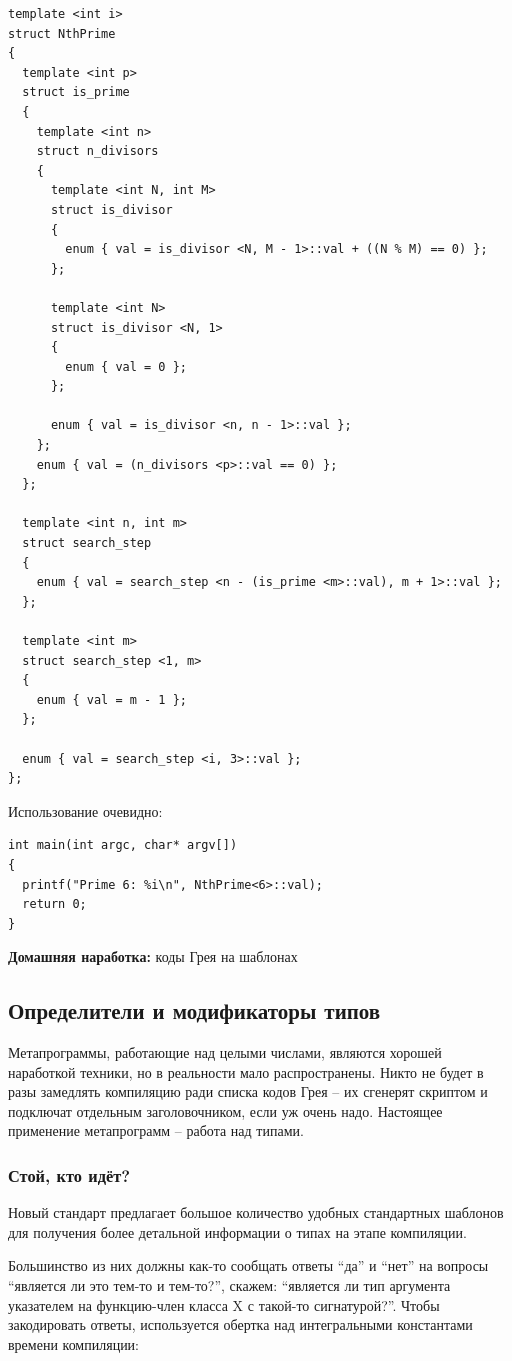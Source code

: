 \documentclass[a4paper,12pt,oneside]{article}
\begin{document}
\begin{lstlisting}
template <int i>
struct NthPrime
{
  template <int p>
  struct is_prime
  {
    template <int n>
    struct n_divisors
    {
      template <int N, int M>
      struct is_divisor
      {
        enum { val = is_divisor <N, M - 1>::val + ((N % M) == 0) };
      };

      template <int N>
      struct is_divisor <N, 1>
      {
        enum { val = 0 };
      };

      enum { val = is_divisor <n, n - 1>::val };
    };
    enum { val = (n_divisors <p>::val == 0) };
  };

  template <int n, int m>
  struct search_step
  {
    enum { val = search_step <n - (is_prime <m>::val), m + 1>::val };
  };

  template <int m>
  struct search_step <1, m>
  {
    enum { val = m - 1 };
  };

  enum { val = search_step <i, 3>::val };
};
\end{lstlisting}

Использование очевидно:

\begin{lstlisting}
int main(int argc, char* argv[])
{
  printf("Prime 6: %i\n", NthPrime<6>::val);
  return 0;
}
\end{lstlisting}

\textbf{Домашняя наработка:} коды Грея на шаблонах

\pagebreak
\subsection{Определители и модификаторы типов}

Метапрограммы, работающие над целыми числами, являются хорошей наработкой техники, но в реальности мало распространены. Никто не будет в разы замедлять компиляцию ради списка кодов Грея -- их сгенерят скриптом и подключат отдельным заголовочником, если уж очень надо. Настоящее применение метапрограмм -- работа над типами.

\subsubsection{Стой, кто идёт?}\label{TypeTraits}

Новый стандарт предлагает большое количество удобных стандартных шаблонов для получения более детальной информации о типах на этапе компиляции. 

Большинство из них должны как-то сообщать ответы ``да'' и ``нет'' на вопросы ``является ли это тем-то и тем-то?'', скажем: ``является ли тип аргумента указателем на функцию-член класса X с такой-то сигнатурой?''. Чтобы закодировать ответы, используется обертка над интегральными константами времени компиляции:
\end{document}
